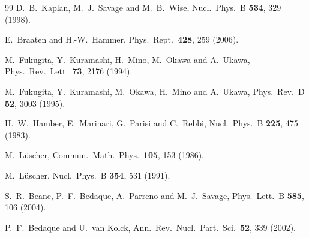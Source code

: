 \documentclass[aps,rmp,nofootinbib,twocolumn,floatfix]{revtex4}
\begin{document}
\begin{thebibliography}{99}
  D.~B.~Kaplan, M.~J.~Savage and M.~B.~Wise,
  Nucl.\ Phys.\  B {\bf 534}, 329 (1998).

  E.~Braaten and H.-W.~Hammer, 
  Phys.\ Rept.\  {\bf 428}, 259 (2006).


  M.~Fukugita, Y.~Kuramashi, H.~Mino, M.~Okawa and A.~Ukawa,
  Phys.\ Rev.\ Lett.\  {\bf 73}, 2176 (1994).

  M.~Fukugita, Y.~Kuramashi, M.~Okawa, H.~Mino and A.~Ukawa,
  Phys.\ Rev.\  D {\bf 52}, 3003 (1995).

  H.~W.~Hamber, E.~Marinari, G.~Parisi and C.~Rebbi,
  Nucl.\ Phys.\  B {\bf 225}, 475 (1983).

  M.~L\"uscher,
  Commun.\ Math.\ Phys.\  {\bf 105}, 153 (1986).

  M.~L\"uscher,
  Nucl.\ Phys.\  B {\bf 354}, 531 (1991).


  S.~R.~Beane, P.~F.~Bedaque, A.~Parreno and M.~J.~Savage,
  Phys.\ Lett.\  B {\bf 585}, 106 (2004).

  P.~F.~Bedaque and U.~van Kolck,
  Ann.\ Rev.\ Nucl.\ Part.\ Sci.\  {\bf 52}, 339 (2002).


\end{thebibliography}
\end{document}
